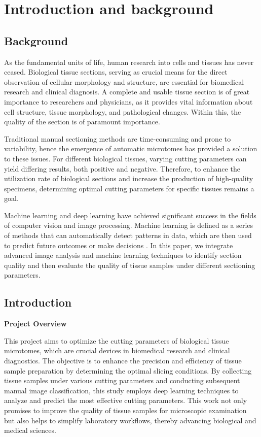 \section{Introduction and background}
\label{sec:introduction}

\subsection{Background}

As the fundamental units of life, human research into cells and tissues has never ceased. Biological tissue sections, serving as crucial means for the direct observation of cellular morphology and structure, are essential for biomedical research and clinical diagnosis. A complete and usable tissue section is of great importance to researchers and physicians, as it provides vital information about cell structure, tissue morphology, and pathological changes. Within this, the quality of the section is of paramount importance.

Traditional manual sectioning methods are time-consuming and prone to variability, hence the emergence of automatic microtomes has provided a solution to these issues. For different biological tissues, varying cutting parameters can yield differing results, both positive and negative. Therefore, to enhance the utilization rate of biological sections and increase the production of high-quality specimens, determining optimal cutting parameters for specific tissues remains a goal.

Machine learning and deep learning have achieved significant success in the fields of computer vision and image processing. Machine learning is defined as a series of methods that can automatically detect patterns in data, which are then used to predict future outcomes or make decisions \cite{1.1}. In this paper, we integrate advanced image analysis and machine learning techniques to identify section quality and then evaluate the quality of tissue samples under different sectioning parameters.

\subsection{Introduction}

\textbf{Project Overview}

This project aims to optimize the cutting parameters of biological tissue microtomes, which are crucial devices in biomedical research and clinical diagnostics. The objective is to enhance the precision and efficiency of tissue sample preparation by determining the optimal slicing conditions. By collecting tissue samples under various cutting parameters and conducting subsequent manual image classification, this study employs deep learning techniques to analyze and predict the most effective cutting parameters. This work not only promises to improve the quality of tissue samples for microscopic examination but also helps to simplify laboratory workflows, thereby advancing biological and medical sciences.

